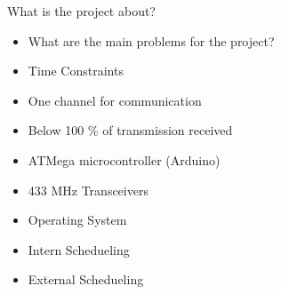 \begin{frame}{What is the project about?}
	\begin{blueblock}
	 	\begin{itemize}
			\item What are the main problems for the project?
			\item Time Constraints
			\item One channel for communication
			\item Below 100 \% of transmission received
		\end{itemize}
	\end{blueblock}

	\begin{blueblock}[Hardware]
		\begin{itemize}
			\item ATMega microcontroller (Arduino)
			\item 433 MHz Transceivers
			\item Operating System
			\item Intern Schedueling
			\item External Schedueling
		\end{itemize}
	\end{blueblock}

\end{frame}

